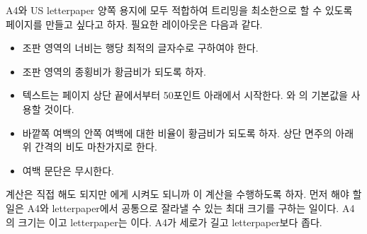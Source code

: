 A4와 US letterpaper 양쪽 용지에 모두 적합하여 트리밍을 최소한으로 할 수 있도록
페이지를 만들고 싶다고 하자. 필요한 레이아웃은 다음과 같다.
\begin{itemize}\tightlist
\item
조판 영역의 너비는 행당 최적의 글자수로 구하여야 한다.
\item 
조판 영역의 종횡비가 황금비가 되도록 하자.
\item 
텍스트는 페이지 상단 끝에서부터 50포인트 아래에서 시작한다.
\lnc{\headheight}와 \lnc{\footskip}의 기본값을 사용할 것이다.
\item 
바깥쪽 여백의 안쪽 여백에 대한 비율이 황금비가 되도록 하자. 상단 면주의
아래 위 간격의 비도 마찬가지로 한다.
\item 
여백 문단은 무시한다.
\end{itemize}
계산은 직접 해도 되지만 \ltx 에게 시켜도 되니까 \ltx 이 계산을 수행하도록 하자.
먼저 해야 할 일은 A4와 letterpaper에서 공통으로 잘라낼 수 있는 최대 크기를 구하는 일이다. A4의 크기는 이고 letterpaper는 이다. A4가 세로가 길고 letterpaper보다 좁다.
